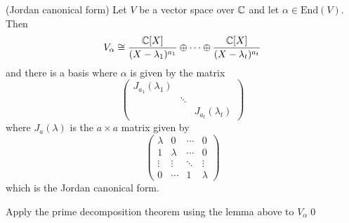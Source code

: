 \documentclass{article}
\begin{document}
\begin{theorem}
	(Jordan canonical form)	Let $ V $ be a vector space over $ \mathbb{C} $ and let $ \alpha\in \mathrm{End}(V) $. Then
	\[
		V_\alpha\cong \frac{\mathbb{C}[X]}{(X-\lambda_1)^{a_1}}\oplus\cdots\oplus\frac{\mathbb{C}[X]}{(X-\lambda_t)^{a_t}}
	\]
	and there is a basis where $ \alpha $ is given by the matrix 
	\[
	  \begin{pmatrix}
		  J_{a_1}(\lambda_1) & & \\
				     & \ddots & \\
				     & & J_{a_t}(\lambda_t) 
	  \end{pmatrix}
	\]
	where $ J_a(\lambda) $ is the $ a\times a $ matrix given by
	\[
	  \begin{pmatrix}
		  \lambda & 0 & \cdots & 0 \\
		  1 & \lambda & \cdots & 0 \\
		  \vdots & \vdots & \ddots & \vdots \\
		  0 & \cdots & 1 & \lambda
	  \end{pmatrix}
	\]
	which is the Jordan canonical form.
\end{theorem}
\pf Apply the prime decomposition theorem using the lemma above to $ V_\alpha $\qed
\end{document}
